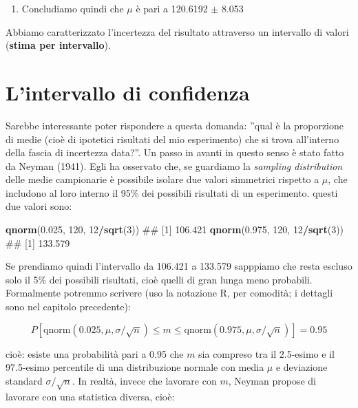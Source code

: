 \documentclass[a4paper,12pt,oneside]{book}
\providecommand{\tightlist}{%
  \setlength{\itemsep}{0pt}\setlength{\parskip}{0pt}}
\newenvironment{Shaded}{\begin{snugshade}}{\end{snugshade}}
\newcommand{\KeywordTok}[1]{\textcolor[rgb]{0.13,0.29,0.53}{\textbf{#1}}}
\newcommand{\DecValTok}[1]{\textcolor[rgb]{0.00,0.00,0.81}{#1}}
\newcommand{\FloatTok}[1]{\textcolor[rgb]{0.00,0.00,0.81}{#1}}
\newcommand{\OperatorTok}[1]{\textcolor[rgb]{0.81,0.36,0.00}{\textbf{#1}}}
\newcommand{\NormalTok}[1]{#1}
\theoremstyle{definition}
\theoremstyle{definition}
\theoremstyle{definition}
\theoremstyle{remark}
\begin{document}
\begin{enumerate}
\def\labelenumi{\arabic{enumi}.}
\setcounter{enumi}{5}
\tightlist
\item
  Concludiamo quindi che \(\mu\) è pari a 120.6192 \(\pm\) 8.053
\end{enumerate}

Abbiamo caratterizzato l'incertezza del risultato attraverso un
intervallo di valori (\textbf{stima per intervallo}).

\section{L'intervallo di confidenza}\label{lintervallo-di-confidenza}

Sarebbe interessante poter rispondere a questa domanda: ''qual è la
proporzione di medie (cioè di ipotetici risultati del mio esperimento)
che si trova all'interno della fascia di incertezza data?''. Un passo in
avanti in questo senso è stato fatto da Neyman (1941). Egli ha osservato
che, se guardiamo la \emph{sampling distribution} delle medie
campionarie è possibile isolare due valori simmetrici rispetto a
\(\mu\), che includono al loro interno il 95\% dei possibili risultati
di un esperimento. questi due valori sono:

\begin{Shaded}
\begin{Highlighting}[]
\KeywordTok{qnorm}\NormalTok{(}\FloatTok{0.025}\NormalTok{, }\DecValTok{120}\NormalTok{, }\DecValTok{12}\OperatorTok{/}\KeywordTok{sqrt}\NormalTok{(}\DecValTok{3}\NormalTok{))}
\NormalTok{## [1] 106.421}
\KeywordTok{qnorm}\NormalTok{(}\FloatTok{0.975}\NormalTok{, }\DecValTok{120}\NormalTok{, }\DecValTok{12}\OperatorTok{/}\KeywordTok{sqrt}\NormalTok{(}\DecValTok{3}\NormalTok{))}
\NormalTok{## [1] 133.579}
\end{Highlighting}
\end{Shaded}

Se prendiamo quindi l'intervallo da 106.421 a 133.579 sapppiamo che
resta escluso solo il 5\% dei possibili risultati, cioè quelli di gran
lunga meno probabili. Formalmente potremmo scrivere (uso la notazione R,
per comodità; i dettagli sono nel capitolo precedente):

\[P  \left[ \textrm{qnorm} ( 0.025,\mu,\sigma/\sqrt{n}) \leq m \leq \textrm{qnorm}(0.975,\mu,\sigma/\sqrt{n} ) \right] = 0.95\]

cioè: esiste una probabilità pari a 0.95 che \(m\) sia compreso tra il
2.5-esimo e il 97.5-esimo percentile di una distribuzione normale con
media \(\mu\) e deviazione standard \(\sigma/\sqrt{n}\). In realtà,
invece che lavorare con \(m\), Neyman propose di lavorare con una
statistica diversa, cioè:
\end{document}

